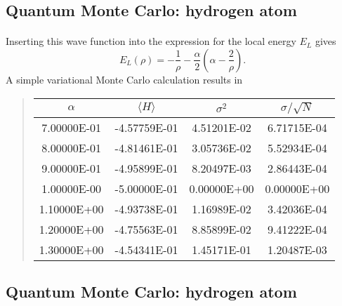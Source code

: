 \documentclass[%
twoside,                 %
final,                   %
10pt]{article}
\begin{document}
\subsection{Quantum Monte Carlo: hydrogen atom}

\paragraph{}
Inserting this wave function into the expression for the
local energy $E_L$ gives
\[
   E_L(\rho)=-\frac{1}{\rho}-
              \frac{\alpha}{2}\left(\alpha-\frac{2}{\rho}\right).
\]
A simple variational Monte Carlo calculation results in

\begin{quote}
\begin{tabular}{cccc}
\hline
\multicolumn{1}{c}{ $\alpha$ } & \multicolumn{1}{c}{ $\langle H \rangle $ } & \multicolumn{1}{c}{ $\sigma^2$ } & \multicolumn{1}{c}{ $\sigma/\sqrt{N}$ } \\
\hline
7.00000E-01 & -4.57759E-01         & 4.51201E-02 & 6.71715E-04       \\
8.00000E-01 & -4.81461E-01         & 3.05736E-02 & 5.52934E-04       \\
9.00000E-01 & -4.95899E-01         & 8.20497E-03 & 2.86443E-04       \\
1.00000E-00 & -5.00000E-01         & 0.00000E+00 & 0.00000E+00       \\
1.10000E+00 & -4.93738E-01         & 1.16989E-02 & 3.42036E-04       \\
1.20000E+00 & -4.75563E-01         & 8.85899E-02 & 9.41222E-04       \\
1.30000E+00 & -4.54341E-01         & 1.45171E-01 & 1.20487E-03       \\
\hline
\end{tabular}
\end{quote}

\noindent




\subsection{Quantum Monte Carlo: hydrogen atom}

\paragraph{}
\end{document}
